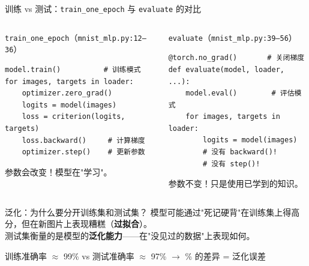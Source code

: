 \documentclass[aspectratio=169]{ctexbeamer}
\begin{document}
\begin{frame}[fragile,shrink=15]{训练 vs 测试：\texttt{train\_one\_epoch} 与 \texttt{evaluate} 的对比}
\small

\begin{columns}[T]
\begin{block}{\texttt{train\_one\_epoch}（\texttt{mnist\_mlp.py:12--36}）}
\footnotesize
\begin{lstlisting}[basicstyle=\ttfamily\footnotesize, frame=none, numbers=none, backgroundcolor=\color{codebg}]
model.train()          # 训练模式
for images, targets in loader:
    optimizer.zero_grad()
    logits = model(images)
    loss = criterion(logits, targets)
    loss.backward()     # 计算梯度
    optimizer.step()    # 更新参数
\end{lstlisting}
\alert{参数会改变！模型在"学习"。}
\end{block}

\begin{block}{\texttt{evaluate}（\texttt{mnist\_mlp.py:39--56}）}
\footnotesize
\begin{lstlisting}[basicstyle=\ttfamily\footnotesize, frame=none, numbers=none, backgroundcolor=\color{codebg}]
@torch.no_grad()       # 关闭梯度
def evaluate(model, loader, ...):
    model.eval()        # 评估模式
    for images, targets in loader:
        logits = model(images)
        # 没有 backward()!
        # 没有 step()!
\end{lstlisting}
\alert{参数不变！只是使用已学到的知识。}
\end{block}
\end{columns}

\vspace{0.15cm}

\begin{exampleblock}{泛化：为什么要分开训练集和测试集？}
\footnotesize
模型可能通过"死记硬背"在训练集上得高分，但在新图片上表现糟糕（\textbf{过拟合}）。\\
测试集衡量的是模型的\textbf{泛化能力}——在"没见过的数据"上表现如何。\\
\begin{center}
训练准确率 $\approx$ 99\% \quad vs \quad 测试准确率 $\approx$ 97\% \quad $\to$ \% 的差异 = 泛化误差
\end{center}
\end{exampleblock}
\end{frame}
\end{document}
